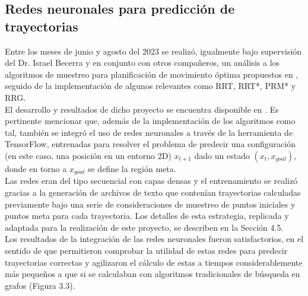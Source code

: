 \documentclass[spanish,mexico]{article}
\numberwithin{equation}{section}
\theoremstyle{definition}
\theoremstyle{remark}
\begin{document}
\subsection{Redes neuronales para predicción de trayectorias}
Entre los meses de junio y agosto del 2023 se realizó, igualmente bajo supervisión del Dr. Israel Becerra y en conjunto con otros compañeros, un análisis a los algoritmos de muestreo para planificación de movimiento óptima propuestos en \cite{Optimal}, seguido de la implementación de algunos relevantes como RRT, RRT*, PRM* y RRG.\\

El desarrollo y resultados de dicho proyecto se encuentra disponible en \cite{Verano}. Es pertinente mencionar que, además de la implementación de los algoritmos como tal, también se integró el uso de redes neuronales a través de la herramienta de TensorFlow, entrenadas para resolver el problema de predecir una configuración (en este caso, una posición en un entorno 2D) $x_{t+1}$ dado un estado $(x_t, x_{goal})$, donde en torno a $x_{goal}$ se define la región meta.\\

Las redes eran del tipo secuencial con capas densas y el entrenamiento se realizó gracias a la generación de archivos de texto que contenían trayectorias calculadas previamente bajo una serie de consideraciones de muestreo de puntos iniciales y puntos meta para cada trayectoria. Los detalles de esta estrategia, replicada y adaptada para la realización de este proyecto, se describen en la Sección 4.5.\\

Los resultados de la integración de las redes neuronales fueron satisfactorios, en el sentido de que permitieron comprobar la utilidad de estas redes para predecir trayectorias correctas y agilizaron el cálculo de estas a tiempos considerablemente más pequeños a que si se calculaban con algoritmos tradicionales de búsqueda en grafos (Figura 3.3).
\end{document}
